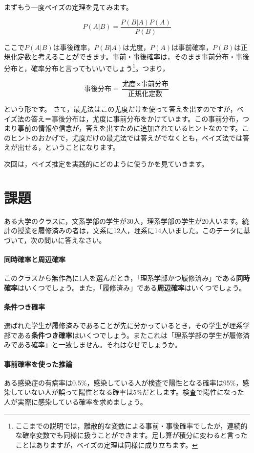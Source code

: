 \documentclass{ltjbook}
\begin{document}
まずもう一度ベイズの定理を見てみます。

\[ P(A|B) = \frac{P(B|A)P(A)}{P(B)} \]

ここで$P(A|B)$は事後確率，$P(B|A)$は尤度，$P(A)$は事前確率，$P(B)$は正規化定数と考えることができます。事前・事後確率は，そのまま事前分布・事後分布と，確率分布と言ってもいいでしょう\footnote{ここまでの説明では，離散的な変数による事前・事後確率でしたが，連続的な確率変数でも同様に扱うことができます。足し算が積分に変わると言ったことはありますが，ベイズの定理は同様に成り立ちます。}。つまり，

\[ \text{事後分布} = \frac{\text{尤度} \times \text{事前分布}}{\text{正規化定数}} \]

という形です。
さて，最尤法はこの尤度だけを使って答えを出すのですが，ベイズ法の答え＝事後分布は，尤度に事前分布をかけています。この事前分布，つまり事前の情報や信念が，答えを出すために追加されているヒントなのです。このヒントのおかげで，尤度だけの最尤法では答えがでなくとも，ベイズ法では答えが出せる，ということになります。

次回は，ベイズ推定を実践的にどのように使うかを見ていきます。

\section{課題}
ある大学のクラスに，文系学部の学生が30人，理系学部の学生が20人います。統計の授業を履修済みの者は，文系に12人，理系に14人いました。このデータに基づいて，次の問いに答えなさい。
\paragraph{同時確率と周辺確率}このクラスから無作為に1人を選んだとき，「理系学部かつ履修済み」である\textbf{同時確率}はいくつでしょう。また，「履修済み」である\textbf{周辺確率}はいくつでしょう。
\paragraph{条件つき確率}選ばれた学生が履修済みであることが先に分かっているとき，その学生が理系学部である\textbf{条件つき確率}はいくつでしょう。またこれは「理系学部の学生が履修済みである確率」と一致しません。それはなぜでしょうか。
\paragraph{事前確率を使った推論}ある感染症の有病率は0.5\%，感染している人が検査で陽性となる確率は95\%，感染していない人が誤って陽性となる確率は5\%だとします。検査で陽性になった人が実際に感染している確率を求めましょう。
\end{document}
